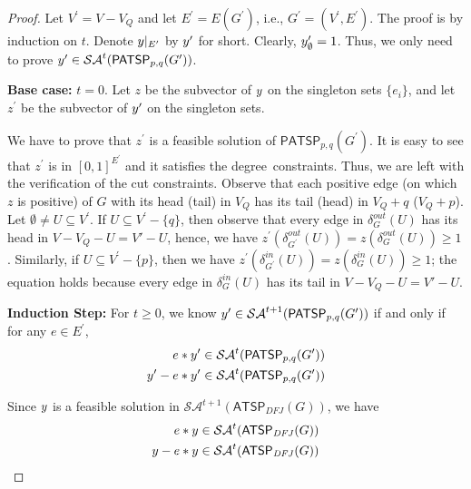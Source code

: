 \documentclass[11pt]{article}
\newcommand{\atspdfj}{\homog{\textsf{ATSP$_{\mathit{DFJ}}$}}}
\newcommand{\PATSP}{\textsf{PATSP}}
\newcommand{\PATSPpolytope}{\widehat{\textsf{PATSP}}}
\newcommand{\saop}{\mathcal{SA}}
\newcommand{\homog}[1]{{#1}}
\begin{document}
\begin{proof}
Let $V^{\prime}=V - V_Q$ and let
$E^{\prime}=E(G^{\prime})$, i.e., $G^{\prime}=(V^{\prime}, E^{\prime})$.
The proof is by induction on $t$.
Denote $y|_{E^{\prime}}$ by $y^{\prime}$ for short.
Clearly, $y^{\prime}_{\emptyset}=1$.
Thus, we only need to prove
$\zveconly^{\prime}\in \saop^t(\homog {\PATSP_{p,q}(G^{\prime})})$.

\noindent \textbf{Base case:}
$t=0$.
Let $z$ be the subvector of $y$ on the singleton sets
$\{e_i\}$, and let $z^{\prime}$ be the subvector of
$y^{\prime}$ on the singleton sets.

We have to prove that $z^{\prime}$ is a feasible solution of
$\PATSPpolytope_{p, q}(G^{\prime})$. It is easy to see that
$z^{\prime}$ is in $[0, 1]^{E^{\prime}}$ and it satisfies the
degree~constraints. Thus, we are left with the verification of the cut
constraints.  Observe that each positive edge (on which $z$ is
positive) of $G$ with its head (tail) in $V_Q$ has its tail (head) in
$V_Q+q$ ($V_Q+p$).
Let $\emptyset\neq U\subseteq V^{\prime}$.
If $U\subseteq V^{\prime} - \{q\}$, then
observe that every edge in $\delta^{out}_{G}(U)$ has
its head in $V - V_Q - U = V'-U$, hence, we have
$z^{\prime}(\delta^{out}_{G^{\prime}}(U)) = z(\delta^{out}_{G}(U))\geq{1}$.
Similarly, if $U\subseteq V^{\prime} - \{p\}$, then we have
$z^{\prime}(\delta^{in}_{G^{\prime}}(U)) = z(\delta^{in}_{G}(U))\geq1$;
the equation holds because every edge in $\delta^{in}_{G}(U)$ has
its tail in $V - V_Q - U = V'-U$.

\noindent \textbf{Induction Step:}
For $t\geq 0$, we know
$\zveconly^{\prime}\in\saop^{t+1}(\homog{\PATSP_{p,q}(G^{\prime})})$
if and only if for any $e\in E^{\prime}$,
\begin{align}
\label{indStep2}
e*\zveconly^{\prime}	&\in \saop^{t}(\homog{\PATSP_{p,q}(G^{\prime})}) \\\nonumber
\zveconly^{\prime} - e*\zveconly^{\prime}	&\in
	\saop^{t}(\homog{\PATSP_{p,q}(G^{\prime})})\nonumber
\end{align}

Since $y$ is a feasible solution in $\saop^{t+1}(\homog{\atspdfj(G)})$, we
have
\begin{align}
e*\zveconly	&\in \saop^{t}(\homog{\atspdfj(G)}) \\\nonumber
\zveconly- e*\zveconly	&\in \saop^{t}(\homog{\atspdfj(G)})\nonumber
\end{align}


\end{proof}
\end{document}

